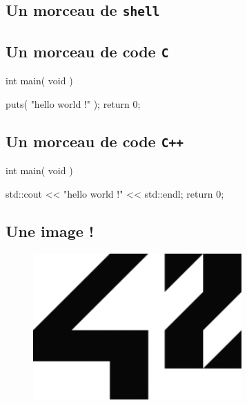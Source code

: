 \documentclass{42-fr}
\begin{document}


        \newpage


        \subsection{Un morceau de \texttt{shell}}




        \subsection{Un morceau de code \texttt{C}}

           \begin{42ccode}
int main( void ) {

    puts( "hello world !" );
    return 0;
}
\end{42ccode}


        \subsection{Un morceau de code \texttt{C++}}

            \begin{42cppcode}
int main( void ) {

    std::cout << "hello world !" << std::endl;
    return 0;
}
\end{42cppcode}


        \subsection{Une image !}

            \begin{figure}[H]
                \begin{center}
                    \includegraphics[width=8cm]{42.png}
                \end{center}
            \end{figure}
\end{document}
